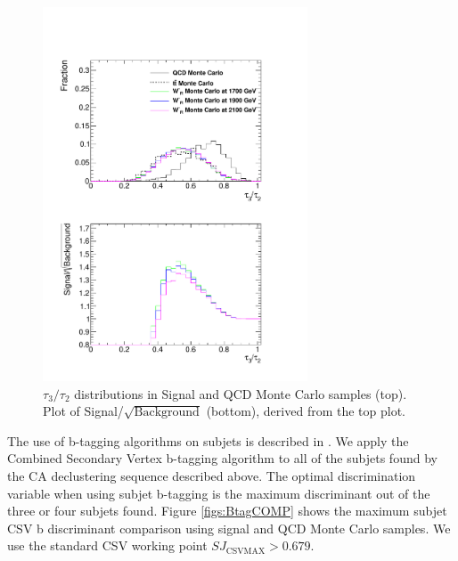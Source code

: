 \begin{figure}[htcb]
\begin{center}
\includegraphics[width=0.7\textwidth]{AN-13-004/figs/tau32Compqcdandsignal.pdf}
\caption{
$\tau_3/\tau_2$ distributions in Signal and QCD Monte Carlo samples (top).  Plot of Signal/$\sqrt{\text{Background}}$ (bottom), derived from the top plot.
}
\label{figs:NsubCOMP}
\end{center}
\end{figure}

The use of b-tagging algorithms on subjets is described in \cite{CMS-PAS-BTV-13-001}.  We apply the Combined Secondary Vertex b-tagging algorithm 
to all of the subjets found by the CA declustering sequence described 
above.  The optimal discrimination variable when using subjet b-tagging is the maximum discriminant out of the three or four subjets found.  
Figure \ref{figs:BtagCOMP} shows the maximum subjet CSV b discriminant comparison using signal and QCD Monte Carlo samples.  We use the standard CSV working point $SJ_{\text{CSVMAX}} > 0.679$.

